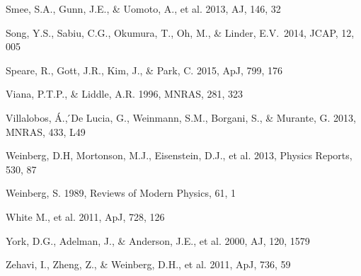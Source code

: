 \documentclass[iop]{emulateapj}
\begin{document}
\begin{thebibliography}{}
Smee, S.A., Gunn, J.E., \& Uomoto, A., et al. 2013, AJ, 146, 32

Song, Y.S., Sabiu, C.G., 
Okumura, T., Oh, M., \& Linder, E.V.\ 2014, JCAP, 12, 005 

Speare, R., Gott, J.R., Kim, J., \& Park, C.
2015, ApJ, 799, 176





Viana, P.T.P., \& Liddle, A.R. 1996, MNRAS, 281, 323

Villalobos, \'{A}., ́De Lucia, G., Weinmann, S.M., Borgani, S., \& Murante, G. 2013, MNRAS, 433, L49

Weinberg, D.H, Mortonson, M.J., Eisenstein, D.J., et al. 2013, Physics Reports, 530, 87



Weinberg, S. 1989, Reviews of Modern Physics, 61, 1



White M., et al. 2011, ApJ, 728, 126

York, D.G., Adelman, J., \& Anderson, J.E., et al. 2000, AJ, 120, 1579

Zehavi, I., Zheng, Z., \& Weinberg, D.H., et al. 2011, ApJ, 736, 59



\end{thebibliography}
\end{document}
